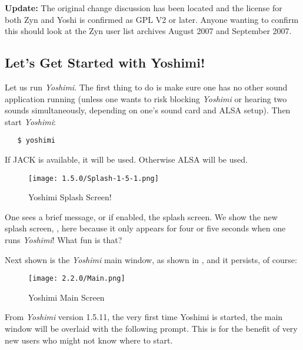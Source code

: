 \documentclass[
 11pt,
 twoside,
 a4paper,
 final                                 %
]{article}
\begin{document}
      \textbf{Update:} The original change discussion has been located and the
      license for both Zyn and Yoshi is confirmed as GPL V2 or later. Anyone
      wanting to confirm this should look at the Zyn user list archives
      August 2007 and September 2007.


\subsection{Let's Get Started with Yoshimi!}
\label{subsec:introduction_lets_get_started}

   Let us run \textsl{Yoshimi}.
   The first
   thing to do is make sure one has no other sound application running
   (unless one wants to risk blocking \textsl{Yoshimi} or hearing two sounds
   simultaneously, depending on one's sound card and ALSA setup).
   Then start \textsl{Yoshimi}:

\begin{verbatim}
   $ yoshimi
\end{verbatim}

   If JACK is available, it will be used.  Otherwise ALSA will be used.

\begin{figure}[H]
   \centering
   \texttt{[image: 1.5.0/Splash-1-5-1.png]}
   \caption{Yoshimi Splash Screen!}
   \label{fig:yoshimi_splash_screen}
\end{figure}

   One sees a brief message, or if enabled, the splash screen.
   We show the new splash screen, ,
   here because it only appears for four or five seconds when one runs
   \textsl{Yoshimi}! What fun is that?

   Next shown is the \textsl{Yoshimi} main window,
   as shown in ,
   and it persists, of course:

\begin{figure}[H]
   \centering
   \texttt{[image: 2.2.0/Main.png]}
   \caption{Yoshimi Main Screen}
   \label{fig:yoshimi_main_screen}
\end{figure}

    From \textsl{Yoshimi} version 1.5.11, the very first time Yoshimi is
    started, the main window will be overlaid with the following prompt. This
    is for the benefit of very new users who might not know where to start.
\end{document}
